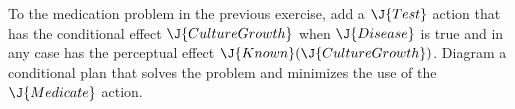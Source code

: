 \begin{uexercise}
To the medication problem in the previous exercise, add a \(\J{Test}\)
action that has the conditional effect \(\J{CultureGrowth}\) when
\(\J{Disease}\) is true and in any case has the perceptual effect
\(\J{Known}(\J{CultureGrowth})\).  Diagram a conditional plan that solves the
problem and minimizes the use of the \(\J{Medicate}\) action.
\end{uexercise} 






























